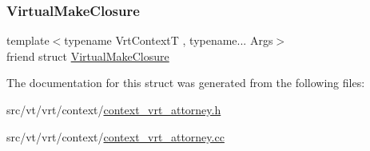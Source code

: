 \subsubsection{\texorpdfstring{Virtual\+Make\+Closure}{VirtualMakeClosure}}
{\footnotesize\ttfamily template$<$typename Vrt\+ContextT , typename... Args$>$ \\
friend struct \hyperlink{structvt_1_1vrt_1_1_virtual_make_closure}{Virtual\+Make\+Closure}\hspace{0.3cm}{\ttfamily [friend]}}



The documentation for this struct was generated from the following files\+:\begin{DoxyCompactItemize}
\item 
src/vt/vrt/context/\hyperlink{context__vrt__attorney_8h}{context\+\_\+vrt\+\_\+attorney.\+h}\item 
src/vt/vrt/context/\hyperlink{context__vrt__attorney_8cc}{context\+\_\+vrt\+\_\+attorney.\+cc}\end{DoxyCompactItemize}
